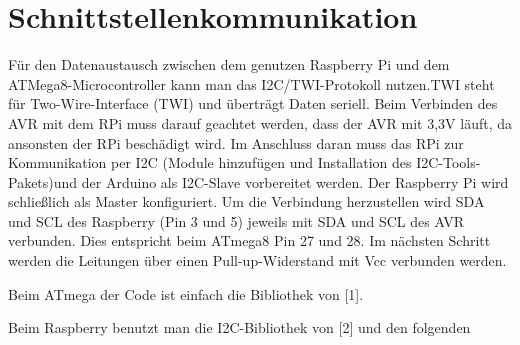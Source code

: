 
\chapter{Schnittstellenkommunikation}
Für den Datenaustausch zwischen dem genutzen Raspberry Pi und dem ATMega8-Microcontroller kann man das I2C/TWI-Protokoll nutzen.TWI steht für Two-Wire-Interface (TWI) und überträgt Daten seriell. 
Beim Verbinden des AVR mit dem RPi muss darauf geachtet werden, dass der AVR mit 3,3V läuft, da ansonsten der RPi beschädigt wird. Im Anschluss daran muss das RPi zur Kommunikation per I2C (Module hinzufügen und Installation des I2C-Tools-Pakets)und der Arduino als I2C-Slave vorbereitet werden. Der Raspberry Pi wird schließlich als Master konfiguriert.
Um die Verbindung herzustellen wird SDA und SCL des Raspberry (Pin 3 und 5) jeweils mit SDA und SCL des AVR verbunden. Dies entspricht beim ATmega8 Pin 27 und 28. Im nächsten Schritt werden die Leitungen über einen Pull-up-Widerstand mit Vcc verbunden werden.

Beim ATmega der Code ist einfach die Bibliothek von [1].

Beim Raspberry benutzt man die I2C-Bibliothek von [2] und den folgenden 

